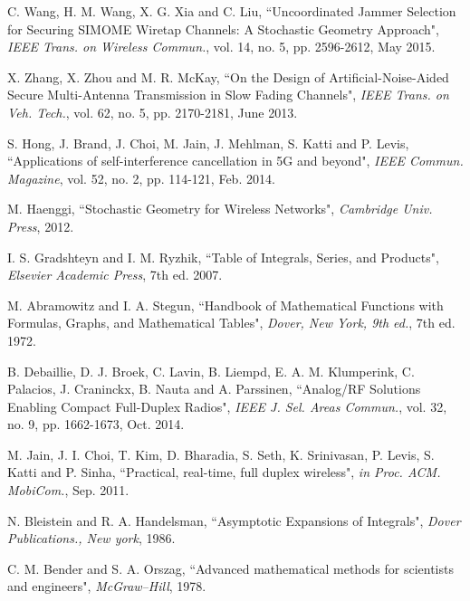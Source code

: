 \documentclass[10pt]{IEEEtran}
\begin{document}
\begin{thebibliography}{9}
C. Wang, H. M. Wang, X. G. Xia and C. Liu, ``Uncoordinated Jammer Selection for Securing \textsc{SIMOME} Wiretap Channels: A Stochastic Geometry Approach", \textit{IEEE Trans. on Wireless Commun.}, vol. 14, no. 5, pp. 2596-2612, May 2015.

X. Zhang, X. Zhou and M. R. McKay, ``On the Design of Artificial-Noise-Aided Secure Multi-Antenna Transmission in Slow Fading Channels", \textit{IEEE Trans. on Veh. Tech.}, vol. 62, no. 5, pp. 2170-2181, June 2013.

S. Hong, J. Brand, J. Choi, M. Jain, J. Mehlman, S. Katti and P. Levis, ``Applications of self-interference cancellation in 5\textsc{G} and beyond", \textit{IEEE Commun. Magazine}, vol. 52, no. 2, pp. 114-121, Feb. 2014.


M. Haenggi, ``Stochastic Geometry for Wireless Networks", \textit{Cambridge Univ. Press}, 2012.


I. S. Gradshteyn and I. M. Ryzhik, ``Table of Integrals, Series, and Products", \textit{Elsevier Academic Press}, 7th ed. 2007.


M. Abramowitz and I. A. Stegun, ``Handbook of Mathematical Functions with Formulas, Graphs, and Mathematical Tables", \textit{Dover, New York, 9th ed.}, 7th ed. 1972.

B. Debaillie, D. J. Broek, C. Lavin, B. Liempd, E. A. M. Klumperink, C. Palacios, J. Craninckx, B. Nauta and A. Parssinen, ``Analog/\textsc{RF} Solutions Enabling Compact Full-Duplex Radios", \textit{IEEE J. Sel. Areas Commun.}, vol. 32, no. 9, pp. 1662-1673, Oct. 2014.


M. Jain, J. I. Choi, T. Kim, D. Bharadia, S. Seth, K. Srinivasan, P. Levis, S. Katti and P. Sinha, ``Practical, real-time, full duplex wireless", \textit{in Proc. ACM. MobiCom.}, Sep. 2011.


N. Bleistein and R. A. Handelsman, ``Asymptotic Expansions of Integrals", \textit{Dover Publications., New york}, 1986.


C. M. Bender and S. A. Orszag, ``Advanced mathematical methods for scientists and engineers", \textit{McGraw–Hill}, 1978.

\end{thebibliography}
\end{document}
